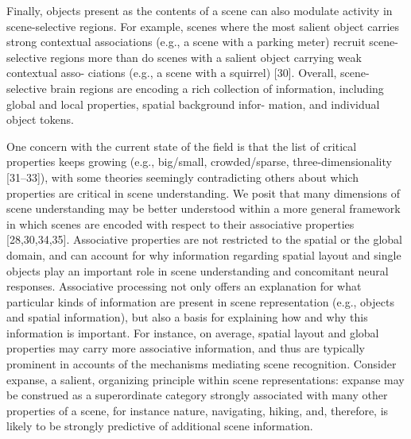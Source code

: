 \documentclass[english]{article}
\begin{document}
%
Finally, objects present as the contents of a scene can also modulate activity
in scene-selective regions\citep{aminoff2015associative}.
%
For example, scenes where the most salient object carries strong contextual
associations (e.g., a scene with a parking meter) recruit scene-selective
regions more than do scenes with a salient object carrying weak contextual asso-
ciations (e.g., a scene with a squirrel) [30]\citep{aminoff2015associative}.
%
Overall, scene-selective brain regions are encoding a rich collection of
information, including global and local properties, spatial background infor-
mation, and individual object tokens\citep{aminoff2015associative}.

%
One concern with the current state of the field is that the list of critical
properties keeps growing (e.g., big/small, crowded/sparse, three-dimensionality
[31–33]), with some theories seemingly contradicting others about which
properties are critical in scene understanding\citep{aminoff2015associative}.
%
We posit that many dimensions of scene understanding may be better understood
within a more general framework in which scenes are encoded with respect to
their associative properties [28,30,34,35]\citep{aminoff2015associative}.
%
Associative properties are not restricted to the spatial or the global domain,
and can account for why information regarding spatial layout and single objects
play an important role in scene understanding and concomitant neural
responses\citep{aminoff2015associative}.
%
Associative processing not only offers an explanation for what particular kinds
of information are present in scene representation (e.g., objects and spatial
information), but also a basis for explaining how and why this information is
important\citep{aminoff2015associative}.
%
For instance, on average, spatial layout and global properties may carry more
associative information, and thus are typically prominent in accounts of the
mechanisms mediating scene recognition\citep{aminoff2015associative}.
%
Consider expanse, a salient, organizing principle within scene representations:
expanse may be construed as a superordinate category strongly associated with
many other properties of a scene, for instance nature, navigating, hiking, and,
therefore, is likely to be strongly predictive of additional scene
information\citep{aminoff2015associative}.
\end{document}
